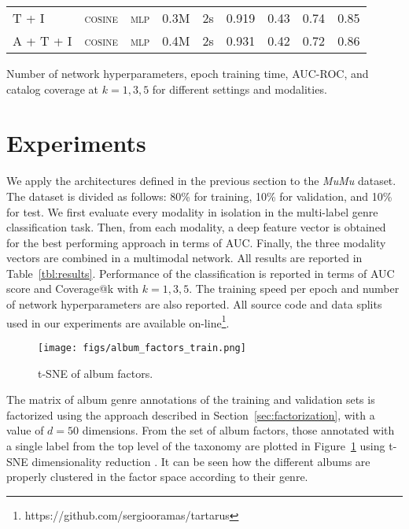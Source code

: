 \documentclass{article}
\begin{document}
\begin{table*}[ht]
\begin{threeparttable}
\begin{tabular}{lcccccccc}
\textsc{T + I} & \textsc{cosine} & \textsc{mlp} & 0.3M & 2s & 0.919 & 0.43 & 0.74 & 0.85 \\
\textsc{A + T + I} & \textsc{cosine} & \textsc{mlp} & 0.4M & 2s & 0.931 & 0.42 & 0.72 & 0.86 \\
\bottomrule
\end{tabular}
    \begin{tablenotes}
      \small
      \item Number of network hyperparameters, epoch training time, AUC-ROC, and catalog coverage at $k = 1,3,5$ for different settings and modalities.
    \end{tablenotes}
   \end{threeparttable}
\end{table*}

\section{Experiments}\label{sec:experiments}

We apply the architectures defined in the previous section to the \emph{MuMu} dataset. 
The dataset is divided as follows: 80\% for training, 10\% for validation, and 10\% for test. We first evaluate every modality in isolation in the multi-label genre classification task. 
Then, from each modality, a deep feature vector is obtained for the best performing approach in terms of AUC. 
Finally, the three modality vectors are combined in a multimodal network. 
All results are reported in Table~\ref{tbl:results}. 
Performance of the classification is reported in terms of AUC score and Coverage@k with $k = 1, 3, 5$. 
The training speed per epoch and number of network hyperparameters are also reported. 
All source code and data splits used in our experiments are available on-line\footnote{https://github.com/sergiooramas/tartarus}.

\begin{figure}[!htp]
\centerline{
\texttt{[image: figs/album\_factors\_train.png]}}
\caption{t-SNE of album factors.}
\label{fig:tsne}
\end{figure}

The matrix of album genre annotations of the training and validation sets is factorized using the approach described in Section~\ref{sec:factorization}, with a value of $d = 50$ dimensions.
From the set of album factors, those annotated with a single label from the top level of the taxonomy are plotted in Figure~\ref{fig:tsne} using t-SNE dimensionality reduction \cite{maaten2008visualizing}.
It can be seen how the different albums are properly clustered in the factor space according to their genre.
\end{document}
